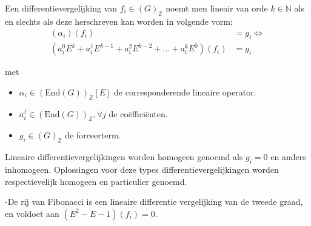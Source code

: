 \documentclass[a4paper,12pt]{article}
\begin{document}
\begin{definition} %
    Een differentievergelijking van $f_i \in (G)_{\mathbb{Z}}$ noemt men lineair van orde $k \in \mathbb{N}$ als en slechts als
    deze herschreven kan worden in volgende vorm:
    \begin{align*}
        (\alpha_i)(f_i)                                                   & = g_i \Leftrightarrow \\
        (a^0_iE^k + a^1_i E^{k-1} + a^2_i E^{k-2} + ... + a^k_i E^0)(f_i) & = g_i
    \end{align*}



    met
    \begin{itemize}
        \item $\alpha_i \in (\text{End}(G))_\mathbb{Z}[E]$ de corresponderende lineaire operator.
        \item $a^j_i \in (\text{End}(G))_\mathbb{Z}, \forall j$ de coëfficiënten.
        \item $g_i \in (G)_{\mathbb{Z}}$ de forceerterm.
    \end{itemize}

    Lineaire differentievergelijkingen worden homogeen genoemd als $g_i = 0$ en anders
    inhomogeen. Oplossingen voor deze types differentievergelijkingen worden respectievelijk homogeen en particulier genoemd.
\end{definition}



\begin{example}[Fibonacci]
    -De rij van Fibonacci is een lineaire differentie vergelijking van de tweede graad, en voldoet aan $(E^2 -E -1)(f_i) =0.$
\end{example}



\end{document}
